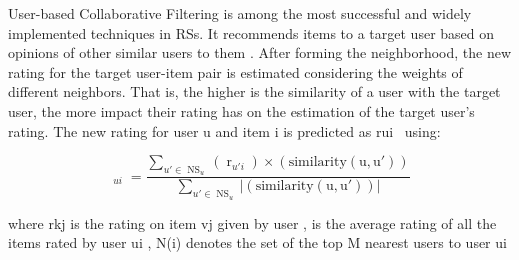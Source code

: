 \documentclass[10pt,twoside,english,a4paper]{article}
\begin{document}
User-based Collaborative Filtering is among the most successful and widely implemented techniques in RSs. It recommends items to a target user based on opinions of other similar users to them . After forming the neighborhood, the new rating for the target user-item pair is estimated considering the weights of different neighbors. That is, the higher is the similarity of a user with the target user, the more impact their rating has on the estimation of the target user’s rating. The new rating for user u and item i is predicted as rui~ using: \cite{8550639}

\begin{equation*} \mathop {\tilde {r}}\nolimits _{ui} =\frac {\sum \limits _{u'\in \mathop {NS}\nolimits _{u}} {(\mathop r\nolimits _{u'i})\times (\text {similarity}(\text {u},\text {u}'))}}{\sum \limits _{u'\in \mathop {NS}\nolimits _{u}} {\vert (\text {similarity}(\text {u},\text {u}'))\vert }}\end{equation*}

where r\tiny{kj} \normalsize is the rating on item v\tiny{j} \normalsize given by user , is the average rating of all the items rated by user u\tiny{i} \normalsize , N(i) denotes the set of the top M nearest users to user u\tiny{i} \normalsize
\cite{CHANG2025121355}









\end{document}
